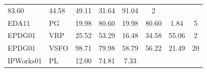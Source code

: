 \documentclass[11pt,a4paper]{article}
\begin{document}
\begin{table}[H]
\begin{tabular}{llcccccc}
    
        83.60
     &

    
        44.58
     &

    
        49.11
     &

    
        31.64
     &

    
        91.04
     &

    
        2
    
    \\

    EDA11 &
    PG &

    
        19.98
     &

    
        80.60
     &

    
        19.98
     &

    
        80.60
     &

    
        1.84
     &

    
        5
    
    \\

    EPDG01 &
    VRP &

    
        25.52
     &

    
        53.29
     &

    
        16.48
     &

    
        34.58
     &

    
        55.06
     &

    
        2
    
    \\

    EPDG01 &
    VSFO &

    
        98.71
     &

    
        79.98
     &

    
        58.79
     &

    
        56.22
     &

    
        21.49
     &

    
        20
    
    \\

    IPWorks01 &
    PL &

    
        12.00
     &

    
        74.81
     &

    
        7.33
     &


\end{tabular}
\end{table}
\end{document}

